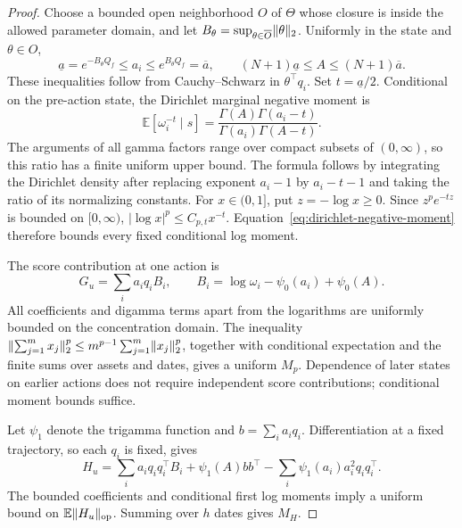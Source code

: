 \documentclass[11pt]{article}
\newcommand{\E}{\mathbb E}
\newcommand{\1}{\mathbf 1}
\newcommand{\op}{\mathrm{op}}
\DeclarePairedDelimiter{\norm}{\lVert}{\rVert}
\theoremstyle{definition}
\begin{document}
\begin{proof}
Choose a bounded open neighborhood $O$ of $\Theta$ whose closure is inside the allowed parameter domain, and let $B_\theta=\sup_{\theta\in\overline O}\norm\theta_2$. Uniformly in the state and $\theta\in O$,
\[
 \underline a=e^{-B_\theta Q_f}\le a_i\le e^{B_\theta Q_f}=\overline a,
 \qquad (N+1)\underline a\le A\le(N+1)\overline a.
\]
These inequalities follow from Cauchy--Schwarz in $\theta^\top q_i$. Set $t=\underline a/2$. Conditional on the pre-action state, the Dirichlet marginal negative moment is
\begin{equation}\label{eq:dirichlet-negative-moment}
 \E[\omega_i^{-t}\mid s]
 =\frac{\Gamma(A)\Gamma(a_i-t)}{\Gamma(a_i)\Gamma(A-t)}.
\end{equation}
The arguments of all gamma factors range over compact subsets of $(0,\infty)$, so this ratio has a finite uniform upper bound. The formula follows by integrating the Dirichlet density after replacing exponent $a_i-1$ by $a_i-t-1$ and taking the ratio of its normalizing constants. For $x\in(0,1]$, put $z=-\log x\ge0$. Since $z^p e^{-tz}$ is bounded on $[0,\infty)$, $|\log x|^p\le C_{p,t}x^{-t}$. Equation~\eqref{eq:dirichlet-negative-moment} therefore bounds every fixed conditional log moment.

The score contribution at one action is
\[
 G_u=\sum_i a_iq_i B_i,\qquad
 B_i=\log\omega_i-\psi_0(a_i)+\psi_0(A).
\]
All coefficients and digamma terms apart from the logarithms are uniformly bounded on the concentration domain. The inequality
$\norm{\sum_{j=1}^m x_j}_2^p\le m^{p-1}\sum_{j=1}^m\norm{x_j}_2^p$, together with conditional expectation and the finite sums over assets and dates, gives a uniform $M_p$. Dependence of later states on earlier actions does not require independent score contributions; conditional moment bounds suffice.

Let $\psi_1$ denote the trigamma function and $b=\sum_i a_iq_i$. Differentiation at a fixed trajectory, so each $q_i$ is fixed, gives
\begin{equation}\label{eq:dirichlet-hessian}
 H_u=\sum_i a_iq_iq_i^\top B_i
 +\psi_1(A)bb^\top
 -\sum_i\psi_1(a_i)a_i^2q_iq_i^\top.
\end{equation}
The bounded coefficients and conditional first log moments imply a uniform bound on $\E\norm{H_u}_{\op}$. Summing over $h$ dates gives $M_H$.


\end{proof}
\end{document}
